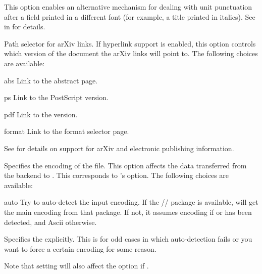 \documentclass{ltxdockit}[2011/03/25]
\newcommand*{\biber}{\sty{biber}\xspace}
\newcommand*{\biblatex}{\sty{biblatex}\xspace}
\begin{document}
\begin{optionlist}

This option enables an alternative mechanism for dealing with unit punctuation after a field printed in a different font (for example, a title printed in italics). See  in  for details.


Path selector for arXiv links. If hyperlink support is enabled, this option controls which version of the document the arXiv  links will point to. The following choices are available:

\begin{valuelist}
\item[abs] Link to the abstract page.
\item[ps] Link to the PostScript version.
\item[pdf] Link to the \pdf version.
\item[format] Link to the format selector page.
\end{valuelist}

See  for details on support for arXiv and electronic publishing information.


Specifies the encoding of the  file. This option affects the data transferred from the backend to \biblatex. This corresponds to \biber's  option. The following choices are available:

\begin{valuelist}

\item[auto] Try to auto-detect the input encoding. If the \slash {}\slash {} package is available, \biblatex will get the main encoding from that package. If not, it assumes \utf encoding if \xetex or \luatex has been detected, and Ascii otherwise.

\item[\prm{encoding}] Specifies the  explicitly. This is for odd cases in which auto-detection fails or you want to force a certain encoding for some reason.

\end{valuelist}
%
Note that setting  will also affect the  option if .


\end{optionlist}
\end{document}
